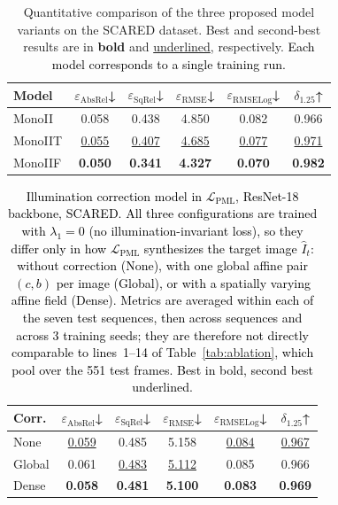 \documentclass[a4paper,fleqn]{cas-dc}
\begin{document}
{%
\begin{table}[h]
\centering
\begin{tabular}{lccccc}
\toprule
Model & $\varepsilon_\text{AbsRel}$↓ & 
       $\varepsilon_\text{SqRel}$↓ & 
       $\varepsilon_\text{RMSE}$↓ & 
       $\varepsilon_\text{RMSELog}$↓ & 
       $\delta_{1.25}$↑ \\
\midrule
MonoII  & 0.058 & 0.438 & 4.850 & 0.082 & 0.966 \\
MonoIIT & \underline{0.055} & \underline{0.407} & 
          \underline{4.685} & \underline{0.077} & 
          \underline{0.971} \\
MonoIIF & \textbf{0.050} & \textbf{0.341} & 
          \textbf{4.327} & \textbf{0.070} & 
          \textbf{0.982} \\
\bottomrule
\end{tabular}
\caption{Quantitative comparison of the three proposed 
model variants on the SCARED dataset. Best and 
second-best results are in \textbf{bold} and 
\underline{underlined}, respectively. \textcolor{black}{Each model corresponds to a single training run.}}
\label{tab:backbone_comparison}
\end{table}
%
\begin{table}[t]
\centering
\caption{\textcolor{black}{Illumination correction model in $\mathcal{L}_\text{PML}$, ResNet-18 backbone, SCARED. All three configurations are trained with $\lambda_1=0$ (no illumination-invariant loss), so they differ only in how $\mathcal{L}_\text{PML}$ synthesizes the target image $\hat{I}_t$: without correction (None), with one global affine pair $(c,b)$ per image (Global), or with a spatially varying affine field (Dense). Metrics are averaged within each of the seven test sequences, then across sequences and across 3 training seeds; they are therefore not directly comparable to lines~1--14 of Table~\ref{tab:ablation}, which pool over the 551 test frames. Best in bold, second best underlined.}}
\label{tab:calib-resnet-lam0}
\small
\begin{tabular}{lccccc}
\toprule
Corr. & $\varepsilon_\text{AbsRel}$↓ & 
       $\varepsilon_\text{SqRel}$↓ & 
       $\varepsilon_\text{RMSE}$↓ & 
       $\varepsilon_\text{RMSELog}$↓ & 
       $\delta_{1.25}$↑  \\
\midrule
None & \underline{0.059} & 0.485 & 5.158 & \underline{0.084} & \underline{0.967} \\
Global & 0.061 & \underline{0.483} & \underline{5.112} & 0.085 & 0.966 \\
Dense& \textbf{0.058} & \textbf{0.481} & \textbf{5.100} & \textbf{0.083} & \textbf{0.969} \\

\end{tabular}
\end{table}}
\end{document}
